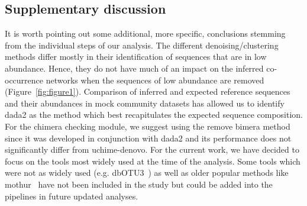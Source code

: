 \documentclass[letterpaper,12pt]{article}
\begin{document}
  \subsection*{Supplementary discussion}

  It is worth pointing out some additional, more specific, conclusions stemming from the individual steps of our analysis.
  The different denoising/clustering methods differ mostly in their identification of sequences that are in low abundance.
  Hence, they do not have much of an impact on the inferred co-occurrence networks when the sequences of low abundance are removed (Figure~\ref{fig:figure1}).
  Comparison of inferred and expected reference sequences and their abundances in mock community datasets has allowed us to identify \ac{dada2} as the method which best recapitulates the expected sequence composition.
  For the chimera checking module, we suggest using the remove bimera method since it was developed in conjunction with \ac{dada2} and its performance does not significantly differ from uchime-denovo.
  For the current work, we have decided to focus on the tools most widely used at the time of the analysis.
  Some tools which were not as widely used (e.g. dbOTU3~\cite{Olesen2017}) as well as older popular methods like mothur~\cite{Schloss2009} have not been included in the study but could be added into the pipelines in future updated analyses.
\end{document}
